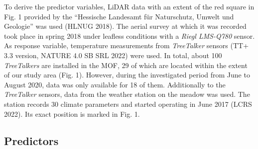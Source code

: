 \documentclass[5p]{elsarticle} %
\begin{document}
To derive the predictor variables, LiDAR data with an extent of the red square in Fig. 1 provided by the “Hessische Landesamt für Naturschutz, Umwelt und Geologie” was used (HLNUG 2018). The aerial survey at which it was recorded took place in spring 2018 under leafless conditions with a \emph{Riegl LMS-Q780} sensor. As response variable, temperature measurements from \emph{TreeTalker} sensors (TT+ 3.3 version, NATURE 4.0 SB SRL 2022) were used. In total, about 100 \emph{TreeTalkers} are installed in the MOF, 29 of which are located within the extent of our study area (Fig. 1). However, during the investigated period from June to August 2020, data was only available for 18 of them. Additionally to the \emph{TreeTalker} sensors, data from the weather station on the meadow was used. The station records 30 climate parameters and started operating in June 2017 (LCRS 2022). Its exact position is marked in Fig. 1.


\hypertarget{predictors}{%
\subsection{\texorpdfstring{Predictors\\
}{Predictors }}\label{Predictors}}
\end{document}
